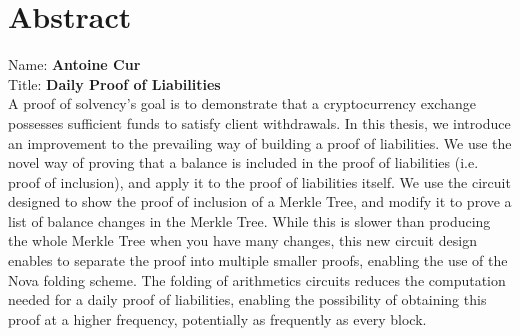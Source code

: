 
\chapter*{Abstract}

Name: 	\tab \textbf{Antoine Cur} \\
Title: 	\tab \textbf{Daily Proof of Liabilities}\\

A proof of solvency's goal is to demonstrate that a cryptocurrency exchange possesses sufficient funds to satisfy client withdrawals. In this thesis, we introduce an improvement to the prevailing way of building a proof of liabilities. We use the novel way of proving that a balance is included in the proof of liabilities (i.e. proof of inclusion), and apply it to the proof of liabilities itself.
We use the circuit designed to show the proof of inclusion of a Merkle Tree, and modify it to prove a list of balance changes in the Merkle Tree. While this is slower than producing the whole Merkle Tree when you have many changes, this new circuit design enables to separate the proof into multiple smaller proofs, enabling the use of the Nova folding scheme. The folding of arithmetics circuits reduces the computation needed for a daily proof of liabilities, enabling the possibility of obtaining this proof at a higher frequency, potentially as frequently as every block.



